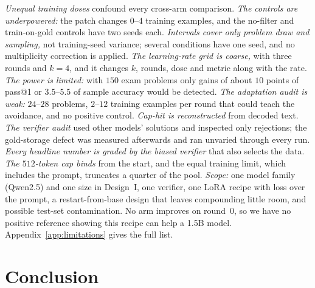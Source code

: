 \documentclass[runningheads]{llncs}
\begin{document}
\emph{Unequal training doses} confound every cross-arm comparison.
\emph{The controls are underpowered:} the patch changes $0$--$4$ training
examples, and the no-filter and train-on-gold controls have two seeds each.
\emph{Intervals cover only problem draw and sampling,} not training-seed
variance; several conditions have one seed, and no multiplicity correction is
applied. \emph{The learning-rate grid is coarse,} with three rounds and $k=4$, and it
changes $k$, rounds, dose and metric along with the rate. \emph{The power is
limited:} with $150$ exam problems only gains of about $10$ points of pass@1
or $3.5$--$5.5$ of sample accuracy would be detected. \emph{The adaptation
audit is weak:} $24$--$28$ problems, $2$--$12$ training examples per round
that could teach the avoidance, and no positive control. \emph{Cap-hit is
reconstructed} from decoded text. \emph{The verifier audit} used other models'
solutions and inspected only rejections; the gold-storage defect was measured
afterwards and ran unvaried through every run. \emph{Every headline number is
graded by the biased verifier} that also selects the data. \emph{The
$512$-token cap binds} from the start, and the equal training limit, which
includes the prompt, truncates a quarter of the pool. \emph{Scope:} one model
family (Qwen2.5) and one size in Design~I, one verifier, one LoRA recipe with
loss over the prompt, a restart-from-base design that leaves compounding
little room, and possible test-set contamination. No arm improves on round~0,
so we have no positive reference showing this recipe can help a 1.5B model.
Appendix~\ref{app:limitations} gives the full list.

\section{Conclusion}
\label{sec:conclusion}
\end{document}
